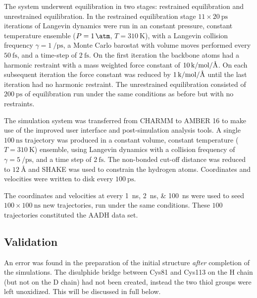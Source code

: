 The system underwent equilibration in two stages: restrained equilibration and unrestrained equilibration. In the restrained equilibration stage $11 \times \SI{20}{\pico\second}$ iterations of Langevin dynamics were run in an constant pressure, constant temperature ensemble ($P=\SI{1}{\atm}$, $T=\SI{310}{\kelvin}$), with a Langevin collision frequency $\gamma=\SI{1}{\per\pico\second}$, a Monte Carlo barostat with volume moves performed every  $\SI{50}{\femto\second}$, and a time-step of $\SI{2}{\femto\second}$. On the first iteration the backbone atoms had a harmonic restraint with a mass weighted force constant of  $\SI{10}{\kilo\cal\per\mol\per\angstrom}$. On each subsequent iteration the force constant was reduced by $\SI{1}{\kilo\cal\per\mol\per\angstrom}$ until the last iteration had no harmonic restraint. The unrestrained equilibration consisted of $\SI{200}{\pico\second}$ of equilibration run under the same conditions as before but with no restraints. 

The simulation system was transferred from CHARMM to AMBER 16 \cite{caseAMBER} to make use of the improved user interface and post-simulation analysis tools. A single  $\SI{100}{\nano\second}$ trajectory was produced in a constant volume, constant temperature ($T=\SI{310}{\kelvin}$) ensemble, using Langevin dynamics with a collision frequency of $\gamma=\SI{5}{\per\pico\second}$, and a time step of $\SI{2}{\femto\second}$. The non-bonded cut-off distance was reduced to $\SI{12}{\angstrom}$ and SHAKE was used to constrain the hydrogen atoms. Coordinates and velocities were written to disk every $\SI{100}{\pico\second}$.  

The coordinates and velocities at every \SIlist[list-final-separator = { ... }]{1; 2; 100}{\nano\second} were used to seed $100 \times \SI{100}{\nano\second}$ new trajectories, run under the same conditions. These $100$ trajectories constituted the AADH data set. 

\subsection{Validation}\label{sec:aadh_validation}

An error was found in the preparation of the initial structure \emph{after} completion of the simulations. The disulphide bridge between Cys81 and Cys113 on the H chain (but not on the D chain) had not been created, instead the two thiol groups were left unoxidized. This will be discussed in full below. 

